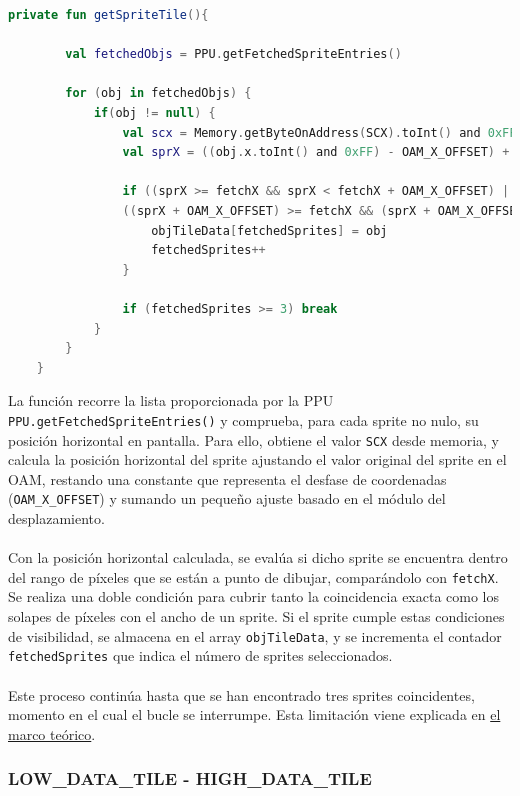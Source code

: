 \begin{lstlisting}[language=Kotlin, caption={FIFO Fetcher - Obtención de Tile de Sprites.}, label={code:ppufifogettileobj}]
    private fun getSpriteTile(){

        val fetchedObjs = PPU.getFetchedSpriteEntries()

        for (obj in fetchedObjs) {
            if(obj != null) {
                val scx = Memory.getByteOnAddress(SCX).toInt() and 0xFF
                val sprX = ((obj.x.toInt() and 0xFF) - OAM_X_OFFSET) + (scx % PIXELS_PER_TILE)

                if ((sprX >= fetchX && sprX < fetchX + OAM_X_OFFSET) ||
                ((sprX + OAM_X_OFFSET) >= fetchX && (sprX + OAM_X_OFFSET) < fetchX + OAM_X_OFFSET)) {
                    objTileData[fetchedSprites] = obj
                    fetchedSprites++
                }

                if (fetchedSprites >= 3) break
            }
        }
    }
\end{lstlisting}

La función recorre la lista proporcionada por la PPU \texttt{PPU.getFetchedSpriteEntries()} y comprueba, para cada sprite no nulo, su posición horizontal en pantalla. Para ello, obtiene el valor \texttt{SCX} desde memoria, y calcula la posición horizontal del sprite ajustando el valor original del sprite en el OAM, restando una constante que representa el desfase de coordenadas (\texttt{OAM\_X\_OFFSET}) y sumando un pequeño ajuste basado en el módulo del desplazamiento.
\\\\
Con la posición horizontal calculada, se evalúa si dicho sprite se encuentra dentro del rango de píxeles que se están a punto de dibujar, comparándolo con \texttt{fetchX}. Se realiza una doble condición para cubrir tanto la coincidencia exacta como los solapes de píxeles con el ancho de un sprite. Si el sprite cumple estas condiciones de visibilidad, se almacena en el array \texttt{objTileData}, y se incrementa el contador \texttt{fetchedSprites} que indica el número de sprites seleccionados.
\\\\
Este proceso continúa hasta que se han encontrado tres sprites coincidentes, momento en el cual el bucle se interrumpe. Esta limitación viene explicada en \hyperref[mem:oam]{el marco teórico}.

\subsubsection{LOW\_DATA\_TILE - HIGH\_DATA\_TILE}


